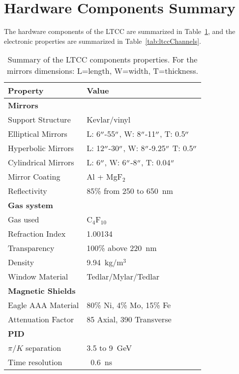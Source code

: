 \section{Hardware Components Summary}

The hardware components of the LTCC are summarized in Table~\ref{tab:ltccProperties}, and the electronic properties
are summarized in Table~\ref{tab:ltccChannels}.

\begin{table}[h]
    \small
	\begin{center}
		\begin{tabular}{| l | l |}
			\hline \hline
			Property                 & Value \\
			\hline
			{\bf Mirrors}            &                               \\
			Support Structure        & Kevlar/vinyl                  \\
			Elliptical Mirrors       & L: 6$^{\prime\prime}$-55$^{\prime\prime}$,  W: 8$^{\prime\prime}$-11$^{\prime\prime}$,  T: 0.5$^{\prime\prime}$     \\
			Hyperbolic Mirrors       & L: 12$^{\prime\prime}$-30$^{\prime\prime}$, W: 8$^{\prime\prime}$-9.25$^{\prime\prime}$ T: 0.5$^{\prime\prime}$  \\
            Cylindrical Mirrors      & L: 6$^{\prime\prime}$, W: 6$^{\prime\prime}$-8$^{\prime\prime}$, T: 0.04$^{\prime\prime}$   \\
			Mirror Coating           & Al + MgF$_2$                  \\
			Reflectivity             & 85\% from 250 to 650~nm       \\
			{\bf Gas system}         &                               \\
			Gas used                 &   C$_4$F$_{10}$               \\
			Refraction Index         & 1.00134                       \\
			Transparency             & 100\% above 220~nm            \\
			Density                  & 9.94~kg/m$^3$                 \\
			Window Material          & Tedlar/Mylar/Tedlar           \\
			{\bf Magnetic Shields}   &                               \\
			Eagle AAA Material       & 80\% Ni, 4\% Mo, 15\% Fe      \\
			Attenuation Factor       &  85 Axial, 390 Transverse     \\
			{\bf PID}                &                               \\
			$\pi/K$ separation       &  3.5 to 9~GeV                 \\
			Time resolution          &  ~0.6~ns                      \\
			\hline \hline
		\end{tabular}
	\end{center}
        \caption{Summary of the LTCC components properties. For the mirrors dimensions: L=length, W=width, T=thickness.}
        \label{tab:ltccProperties}
\end{table}


